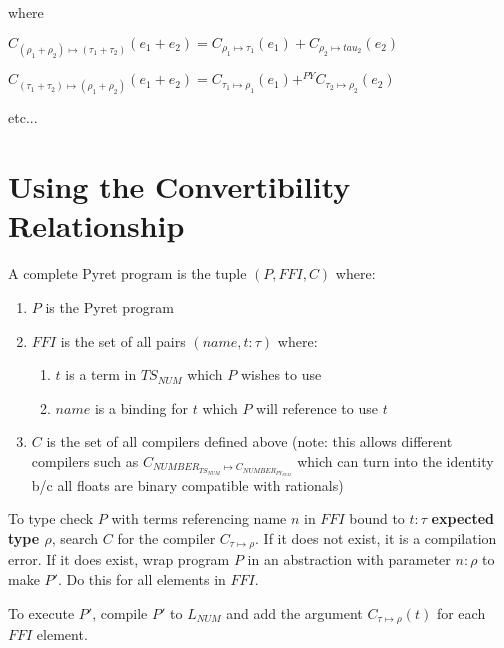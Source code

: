 \documentclass{article}
\begin{document}
	where
	\begin{center}
		\item $C_{(\rho_1 + \rho_2) \mapsto (\tau_1 + \tau_2)}(e_1 + e_2) = C_{\rho_1 \mapsto \tau_1}(e_1) + C_{\rho_2 \mapsto tau_2}(e_2)$
		\item $C_{(\tau_1 + \tau_2) \mapsto (\rho_1 + \rho_2)}(e_1 + e_2) = C_{\tau_1 \mapsto \rho_1}(e_1) +^{PY} C_{\tau_2 \mapsto \rho_2}(e_2)$
	\end{center}

	etc...

	\section{Using the Convertibility Relationship}
	A complete Pyret program is the tuple $(P, FFI, C)$ where:
	\begin{enumerate}
		\item $P$ is the Pyret program
		\item $FFI$ is the set of all pairs $(name, t: \tau)$ where:
			\begin{enumerate}
				\item $t$ is a term in $TS_{NUM}$ which $P$ wishes to use
				\item $name$ is a binding for $t$ which $P$ will reference to use $t$
			\end{enumerate}
		\item $C$ is the set of all compilers defined above (note: this allows different compilers such as $C_{NUMBER_{TS_{NUM}} \mapsto C_{NUMBER_{PY_{NUM}}}}$ which can turn into the identity b/c all floats are binary compatible with rationals)
	\end{enumerate}

	To type check $P$ with terms referencing name $n$ in $FFI$ bound to $t: \tau$ {\bf expected type $\rho$}, search $C$ for the compiler $C_{\tau \mapsto \rho}$. If it does not exist, it is a compilation error. If it does exist, wrap program $P$ in an abstraction with parameter $n: \rho$ to make $P'$. Do this for all elements in $FFI$.
	
	To execute $P'$, compile $P'$ to $L_{NUM}$ and add the argument $C_{\tau \mapsto \rho}(t)$ for each $FFI$ element.\\
		
	\printbibliography[heading=bibintoc]
\end{document}
